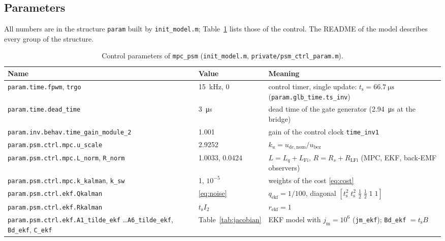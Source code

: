 \documentclass[11pt,a4paper]{scrartcl}
\newcommand{\ped}[1]{_{\mathrm{#1}}}
\newcommand{\code}[1]{\texttt{#1}}
\begin{document}
\begin{onehalfspace}
\section{Parameters}
\label{sec:params}

All numbers are in the structure \code{param} built by \code{init\_model.m}; Table~\ref{tab:params} lists those of the control. The README of the model describes every group of the structure.

\begin{table}[H]
	\centering
	\footnotesize
	\caption{Control parameters of \code{mpc\_psm} (\code{init\_model.m}, \code{private/psm\_ctrl\_param.m}).}
	\label{tab:params}
	\begin{tabularx}{\textwidth}{@{} >{\raggedright\arraybackslash}p{5.3cm} l X @{}}
		\toprule
		\textbf{Name} & \textbf{Value} & \textbf{Meaning} \\
		\midrule
		\code{param.time.fpwm}, \code{trgo} & \SI{15}{\kilo\hertz}, 0 & control timer, single update: $t\ped{s} = \SI{66.7}{\micro\second}$ (\code{param.glb\_time.ts\_inv}) \\
		\code{param.time.dead\_time} & \SI{3}{\micro\second} & dead time of the gate generator (\SI{2.94}{\micro\second} at the bridge) \\
		\code{param.inv.behav.}\newline\code{time\_gain\_module\_2} & 1.001 & gain of the control clock \code{time\_inv1} \\
		\code{param.psm.ctrl.mpc.u\_scale} & 2.9252 & $k_u = u\ped{dc,nom}/u\ped{bez}$ \\
		\code{param.psm.ctrl.mpc.L\_norm}, \code{R\_norm} & 1.0033, 0.0424 & $L = L_q + L\ped{Fi}$, $R = R_s + R\ped{LFi}$ (MPC, EKF, back-EMF observers) \\
		\code{param.psm.ctrl.mpc.k\_kalman}, \code{k\_sw} & 1, $10^{-5}$ & weights of the cost \eqref{eq:cost} \\
		\code{param.psm.ctrl.ekf.Qkalman} & \eqref{eq:noise} & $q\ped{ekf} = 1/100$, diagonal $[t\ped{s}^2\; t\ped{s}^2\; \frac12\; \frac12\; 1\; 1]$ \\
		\code{param.psm.ctrl.ekf.Rkalman} & $t\ped{s} I_2$ & $r\ped{ekf} = 1$ \\
		\code{param.psm.ctrl.ekf.A1\_tilde\_ekf} \ldots \code{A6\_tilde\_ekf}, \code{Bd\_ekf}, \code{C\_ekf} & Table~\ref{tab:jacobian} & EKF model with $j\ped{m} = 10^6$ (\code{jm\_ekf}); \code{Bd\_ekf} $= t\ped{s}B$ \\

\end{tabularx}
\end{table}
\end{onehalfspace}
\end{document}

